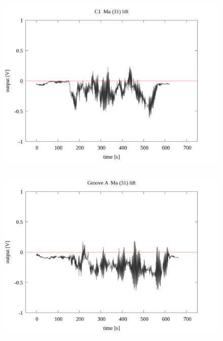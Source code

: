 \documentclass[a4paper]{jsarticle}
\begin{document}
\begin{figure}[htbp]
    \footnotesize
    \begin{center}
        \includegraphics[width=140mm]{../../../33_result/210806/moving_average/31/lift/C1_ma(31)_lift.png}
    \end{center}
\end{figure}

\begin{figure}[htbp]
    \footnotesize
    \begin{center}
        \includegraphics[width=140mm]{../../../33_result/210806/moving_average/31/lift/Groove_A_ma(31)_lift.png}
    \end{center}
\end{figure}
\end{document}
